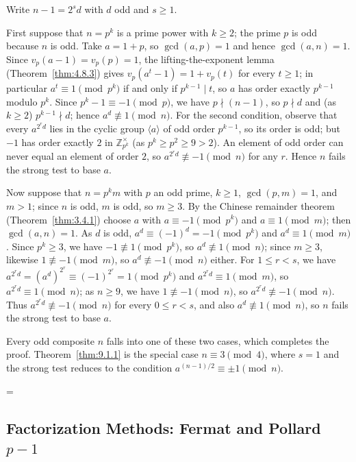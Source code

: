 \documentclass[11pt]{article}
\makeatletter
\theoremstyle{ntstyle}
\let\nt@closedisplay\]
\def\nt@guardedclose{\@ifnextchar\par{\nt@closeafterpar}{\@ifnextchar\end{\postdisplaypenalty\@M\nt@closedisplay}{\nt@closedisplay}}}
\def\nt@closeafterpar\par{\@ifnextchar\par{\nt@closeafterpar}{\@ifnextchar\end{\postdisplaypenalty\@M\nt@closedisplay\par}{\nt@closedisplay\par}}}
\renewenvironment{proof}[1][\proofname]{\par
  \pushQED{\qed}\normalfont\topsep\medskipamount\edef\nt@afterproof{\@endparpenalty=\the\@endparpenalty\relax}\@beginparpenalty\@M\@endparpenalty\@M\let\]\nt@guardedclose\trivlist\item[]\textit{#1\@addpunct{.}} \ignorespaces}{\ifvmode\addpenalty\@M\fi\popQED\nt@afterproof\endtrivlist\@endpefalse}
\newcommand{\ZmodUnits}[1]{\mathbb{Z}_{#1}^{\times}}
\makeatother
\begin{document}
\begin{proof} Write $n-1=2^{s}d$ with $d$ odd and $s\ge1$.

	First suppose that $n=p^{k}$ is a prime power with $k\ge2$; the prime
	$p$ is odd because $n$ is odd. Take $a=1+p$, so $\gcd(a, p)=1$ and
	hence $\gcd(a, n)=1$. Since
	$v_p(a-1)=v_p(p)=1$, the lifting-the-exponent lemma (Theorem~\ref{thm:4.8.3}) gives
	$v_p(a^{t}-1)=1+v_p(t)$ for every $t\ge1$; in particular
	$a^t\equiv1\pmod{p^k}$ if and only if $p^{k-1}\mid t$, so $a$ has order exactly
	$p^{k-1}$ modulo $p^k$. Since $p^k-1\equiv-1\pmod{p}$, we have $p\nmid(n-1)$,
	so $p\nmid d$ and (as $k\ge2$) $p^{k-1}\nmid d$; hence
	$a^{d}\not\equiv1\pmod{n}$. For the second condition, observe that every
	$a^{2^rd}$ lies in the cyclic group $\langle a\rangle$ of odd order
	$p^{k-1}$, so its order is odd; but $-1$ has order exactly $2$ in
	$\ZmodUnits{p^k}$ (as $p^k\ge p^2\ge9>2$). An
	element of odd order can never equal an element of order $2$, so
	$a^{2^{r}d}\not\equiv-1\pmod{n}$ for any $r$. Hence $n$ fails the
	strong test to base $a$.

	Now suppose that $n=p^{k}m$ with $p$ an odd prime, $k\ge1$,
	$\gcd(p, m)=1$, and $m>1$; since $n$ is odd, $m$ is odd, so $m\ge3$.
	By the
	Chinese remainder theorem (Theorem~\ref{thm:3.4.1}) choose $a$ with
	$a\equiv-1\pmod{p^k}$ and $a\equiv1\pmod{m}$; then $\gcd(a, n)=1$. As
	$d$ is odd, $a^{d}\equiv(-1)^d=-1\pmod{p^{k}}$ and $a^{d}\equiv1\pmod{m}$. Since $p^{k}\ge3$, we have $-1\not\equiv1\pmod{p^k}$, so
	$a^{d}\not\equiv1\pmod{n}$; since $m\ge3$, likewise $1\not\equiv-1\pmod{m}$, so
	$a^{d}\not\equiv-1\pmod{n}$ either. For $1\le r<s$, we have
	$a^{2^{r}d}=(a^{d})^{2^{r}}\equiv(-1)^{2^r}=1\pmod{p^{k}}$ and
	$a^{2^{r}d}\equiv1\pmod{m}$, so $a^{2^{r}d}\equiv1\pmod{n}$; as $n\ge9$,
	we have $1\not\equiv-1\pmod{n}$, so $a^{2^{r}d}\not\equiv-1\pmod{n}$. Thus
	$a^{2^{r}d}\not\equiv-1\pmod{n}$ for every $0\le r<s$, and also
	$a^{d}\not\equiv1\pmod{n}$, so $n$ fails the strong test to base $a$.

	Every odd composite $n$ falls into one of these two cases, which completes the
	proof. Theorem~\ref{thm:9.1.1} is the special case $n\equiv3\pmod{4}$, where
	$s=1$ and the strong test reduces to the condition
	$a^{(n-1)/2}\equiv\pm1\pmod{n}$.

\end{proof}
\subsection{Factorization Methods: Fermat and Pollard \texorpdfstring{$p-1$}{p-1}}
\end{document}
